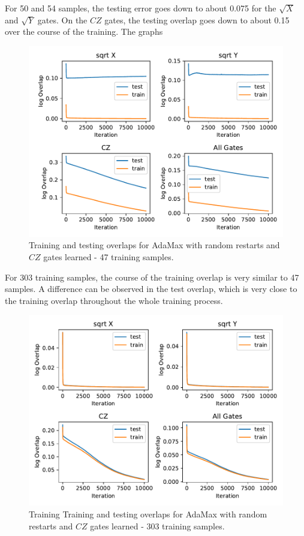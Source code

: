 For 50 and 54 samples, the testing error goes down to about 0.075 for the $\sqrt{X}$ and $\sqrt{Y}$ gates. 
On the $CZ$ gates, the testing overlap goes down to about 0.15 over the course of the training. The graphs 

\begin{figure}[H]
  \centering
  \includegraphics[width=\textwidth]{figures/results/AM-restarts-learned/avgOverlap_47.pdf}
  \caption[Training and Testing Overlaps for AdaMax with Random Restarts and $CZ$ Gates Learned - 47 Samples]{
  Training and testing overlaps for AdaMax with random restarts and $CZ$ gates learned - 47 training samples.}
  \label{fig:am_overlap_47}
\end{figure}

For 303 training samples, the course of the training overlap is very similar to 47 samples.
A difference can be observed in the test overlap, which is very close to the training overlap 
throughout the whole training process.

\begin{figure}[H]
  \centering
  \includegraphics[width=\textwidth]{figures/results/AM-restarts-learned/avgOverlap_303.pdf}
  \caption[Training and Testing Overlaps for AdaMax with Random Restarts and $CZ$ Gates Learned - 303 Samples]{Training 
  Training and testing overlaps for AdaMax with random restarts and $CZ$ gates learned - 303 training samples.}
  \label{fig:am_overlap_303}
\end{figure}

